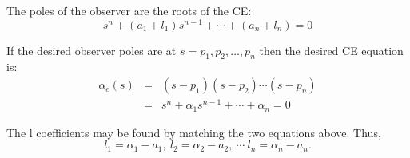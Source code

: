 The poles of the observer are the roots of the CE:
\[
s^n+(a_1+l_1)s^{n-1}+\cdots+(a_n+l_n)=0
\]
 

If the desired observer poles are at  $s=p_1,p_2,\ldots,p_n$ 
then the desired CE equation is:
\begin{eqnarray*}
	\alpha_e(s) & = & (s-p_1)(s-p_2)\cdots(s-p_n) \\
	            & = & s^n + \alpha_1s^{n-1} + \cdots + \alpha_n = 0
\end{eqnarray*}
 

The  l  coefficients may be found by matching the two equations above. 
Thus,
\[
l_1=\alpha_1-a_1,\ l_2=\alpha_2-a_2,\ \cdots\ l_n=\alpha_n-a_n.
\]


 
 

\endinput

